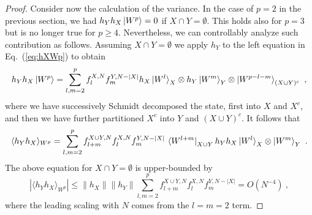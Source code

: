 \documentclass[10pt,a4paper]{amsart}
\begin{document}
\begin{proof}
    Consider now the calculation of the variance.
    In the case of $p=2$ in the previous section, we had $h_Y h_X \ket{W^p} = 0$ if $X \cap Y = \emptyset$.
    This holds also for $p = 3$ but is no longer true for $p \geq 4$.
    Nevertheless, we can controllably analyze such contribution as follows.
    Assuming $X \cap Y = \emptyset$ we apply $h_Y$ to the left equation in Eq.~(\ref{eq:hXWp}) to obtain
    \begin{equation}
        h_Y h_X\ket{W^p} = \sum_{l,m=2}^{p} f_{l}^{X,N}f_{m}^{Y,N-|X|} h_X\ket{W^l}_X \otimes h_Y\ket{W^m}_Y \otimes \ket{W^{p-l-m}}_{(X\cup Y)^c} ~,
    \end{equation}
    where we have successively Schmidt decomposed the state, first into $X$ and $X^c$, and then we have further partitioned $X^c$ into $Y$ and $(X \cup Y)^c$.
    It follows that
    \begin{equation}
        \langle h_Y h_X \rangle_{W^p} = \sum_{l,m=2}^p f^{X\cup Y,N}_{l+m}f_{l}^{X,N}f^{Y,N-|X|}_{m} \,
        \bra{W^{l+m}}_{X\cup Y}h_Y h_X \ket{W^l}_X \otimes \ket{W^m}_Y ~.
    \end{equation}
    The above equation for $X \cap Y = \emptyset$ is upper-bounded by
    \begin{equation}
        |\langle h_Y h_X \rangle_{W^p}| \leq \|h_X\| \|h_Y\| \sum_{l,m=2}^p f^{X\cup Y,N}_{l+m}f_{l}^{X,N}f^{Y,N-|X|}_{m} 
        = O(N^{-4}) ~,
        \label{eq:hyhxnooverlap}
    \end{equation}
    where the leading scaling with $N$ comes from the $l = m = 2$ term.


\end{proof}
\end{document}
